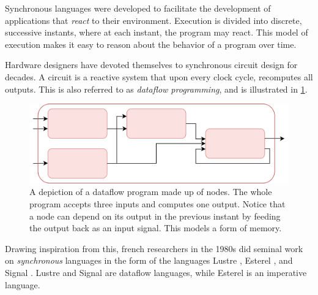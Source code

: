 Synchronous languages were developed to facilitate the development of applications that \textit{react} to their
environment. Execution is divided into discrete, successive instants, where at each instant, the program may react.
This model of execution makes it easy to reason about the behavior of a program over time.

Hardware designers have devoted themselves to synchronous circuit design for decades. A circuit is a reactive system
that upon every clock cycle, recomputes all outputs. This is also referred to as \textit{dataflow programming}, and is
illustrated in \ref{graphics:dataflow}.


\begin{figure}
    \centering
    \includegraphics[scale=0.2]{graphics/lustre-nodes.png}
    \caption{A depiction of a dataflow program made up of nodes. The whole program accepts three inputs and computes
    one output. Notice that a node can depend on its output in the previous instant by feeding the output back as an input
    signal. This models a form of memory.}
    \label{graphics:dataflow}
\end{figure}

Drawing inspiration from this, french researchers in the 1980s did seminal work on \textit{synchronous} languages in the
form of the languages Lustre \cite{DBLP:conf/popl/CaspiPHP87}, Esterel \cite{DBLP:journals/scp/BerryG92},
and Signal \cite{DBLP:journals/scp/BenvenisteGJ91}. Lustre and Signal are dataflow languages, while Esterel
is an imperative language.

